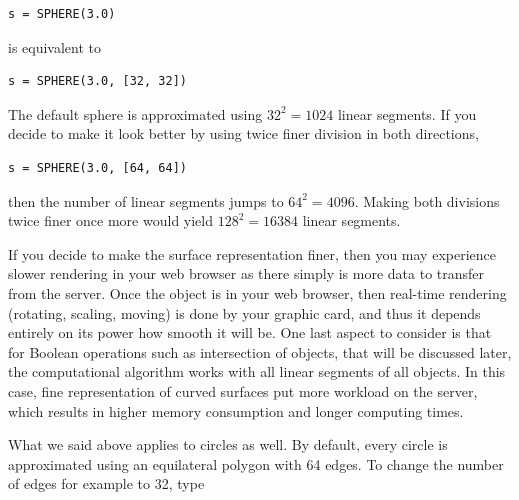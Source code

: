 \begin{bbox}
\begin{verbatim}
s = SPHERE(3.0)
\end{verbatim}
\end{bbox}
\vspace{6mm}

\noindent
is equivalent to \\

\begin{bbox}
\begin{verbatim}
s = SPHERE(3.0, [32, 32])
\end{verbatim}
\end{bbox}
\vspace{6mm}

\noindent
The default sphere is approximated using $32^2 = 1024$ linear
segments. If you decide to make it look better by using 
twice finer division in both directions,\\

\begin{bbox}
\begin{verbatim}
s = SPHERE(3.0, [64, 64])
\end{verbatim}
\end{bbox}
\vspace{6mm}

\noindent
then the number of linear segments jumps to $64^2 = 4096$. Making 
both divisions twice finer once more would yield $128^2 = 16384$ linear
segments. 

If you decide to make the surface representation finer, then you may experience 
slower rendering in your web browser as there simply is more data 
to transfer from the server. Once the object is in your web browser,
then real-time rendering (rotating, scaling, moving) is done by your 
graphic card, and thus it depends entirely on its power how smooth
it will be. One last aspect to consider is that for Boolean operations 
such as intersection of objects, that will be discussed later, the 
computational algorithm works with all linear segments of all objects. 
In this case, fine representation of curved surfaces put more workload 
on the server, which results in higher memory consumption and longer 
computing times. 

What we said above applies to circles as well. By default, every circle 
is approximated using an equilateral polygon 
with 64 edges. To change the number of edges for example to 32, type\\

